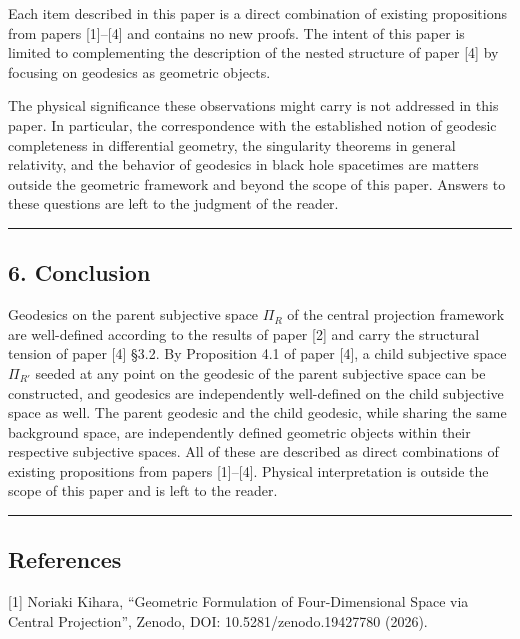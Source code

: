 \documentclass[a4paper,11pt]{article}
\theoremstyle{definition}
\begin{document}
Each item described in this paper is a direct combination of existing propositions from papers {[}1{]}--{[}4{]} and contains no new proofs. The intent of this paper is limited to complementing the description of the nested structure of paper {[}4{]} by focusing on geodesics as geometric objects.

The physical significance these observations might carry is not addressed in this paper. In particular, the correspondence with the established notion of geodesic completeness in differential geometry, the singularity theorems in general relativity, and the behavior of geodesics in black hole spacetimes are matters outside the geometric framework and beyond the scope of this paper. Answers to these questions are left to the judgment of the reader.

\begin{center}\rule{0.5\linewidth}{0.5pt}\end{center}

\subsection{6. Conclusion}\label{conclusion}

Geodesics on the parent subjective space \(\Pi_R\) of the central projection framework are well-defined according to the results of paper {[}2{]} and carry the structural tension of paper {[}4{]} §3.2. By Proposition 4.1 of paper {[}4{]}, a child subjective space \(\Pi_{R'}\) seeded at any point on the geodesic of the parent subjective space can be constructed, and geodesics are independently well-defined on the child subjective space as well. The parent geodesic and the child geodesic, while sharing the same background space, are independently defined geometric objects within their respective subjective spaces. All of these are described as direct combinations of existing propositions from papers {[}1{]}--{[}4{]}. Physical interpretation is outside the scope of this paper and is left to the reader.

\begin{center}\rule{0.5\linewidth}{0.5pt}\end{center}

\subsection{References}\label{references}

{[}1{]} Noriaki Kihara, ``Geometric Formulation of Four-Dimensional Space via Central Projection'', Zenodo, DOI: 10.5281/zenodo.19427780 (2026).
\end{document}
